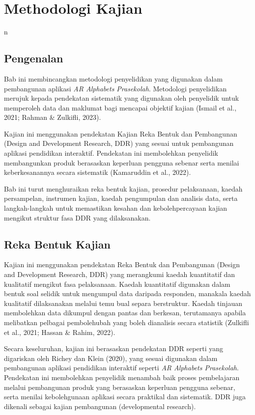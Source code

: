 \chapter{Methodologi Kajian}n 
\section{Pengenalan}

Bab ini membincangkan metodologi penyelidikan yang digunakan dalam pembangunan aplikasi \textit{AR Alphabets Prasekolah}. Metodologi penyelidikan merujuk kepada pendekatan sistematik yang digunakan oleh penyelidik untuk memperoleh data dan maklumat bagi mencapai objektif kajian (Ismail et al., 2021; Rahman & Zulkifli, 2023). 

Kajian ini menggunakan pendekatan Kajian Reka Bentuk dan Pembangunan (Design and Development Research, DDR) yang sesuai untuk pembangunan aplikasi pendidikan interaktif. Pendekatan ini membolehkan penyelidik membangunkan produk berasaskan keperluan pengguna sebenar serta menilai keberkesanannya secara sistematik (Kamaruddin et al., 2022). 

Bab ini turut menghuraikan reka bentuk kajian, prosedur pelaksanaan, kaedah persampelan, instrumen kajian, kaedah pengumpulan dan analisis data, serta langkah-langkah untuk memastikan kesahan dan kebolehpercayaan kajian mengikut struktur fasa DDR yang dilaksanakan.
\section{Reka Bentuk Kajian}

Kajian ini menggunakan pendekatan Reka Bentuk dan Pembangunan (Design and Development Research, DDR) yang merangkumi kaedah kuantitatif dan kualitatif mengikut fasa pelaksanaan. Kaedah kuantitatif digunakan dalam bentuk soal selidik untuk mengumpul data daripada responden, manakala kaedah kualitatif dilaksanakan melalui temu bual separa berstruktur. Kaedah tinjauan membolehkan data dikumpul dengan pantas dan berkesan, terutamanya apabila melibatkan pelbagai pembolehubah yang boleh dianalisis secara statistik (Zulkifli et al., 2021; Hassan & Rahim, 2022).

Secara keseluruhan, kajian ini berasaskan pendekatan DDR seperti yang digariskan oleh Richey dan Klein (2020), yang sesuai digunakan dalam pembangunan aplikasi pendidikan interaktif seperti \textit{AR Alphabets Prasekolah}. Pendekatan ini membolehkan penyelidik menambah baik proses pembelajaran melalui pembangunan produk yang berasaskan keperluan pengguna sebenar, serta menilai kebolehgunaan aplikasi secara praktikal dan sistematik. DDR juga dikenali sebagai kajian pembangunan (developmental research).

